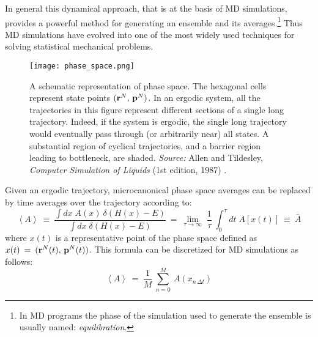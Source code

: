 In general this dynamical approach, that is at the basis of MD simulations, provides a powerful method for generating an ensemble and its averages.\footnote{In MD programs the phase of the simulation used to generate the ensemble is usually named: \textit{equilibration}.} Thus MD simulations have evolved into one of the most widely used techniques for solving statistical mechanical problems.

\begin{figure}[H]
\centering
\begin{minipage}[t]{0.8\textwidth}
	\centering
    \texttt{[image: phase\_space.png]}
    
    \footnotesize{\caption{A schematic representation of phase space. The hexagonal cells represent state points $( \bold{r}^N, \, \bold{p}^N )$. In an ergodic system, all the trajectories in this figure represent different sections of a single long trajectory. Indeed, if the system is ergodic, the single long trajectory would eventually pass through (or arbitrarily near) all states. A substantial region of cyclical trajectories, and a barrier region leading to bottleneck, are shaded. 
    \textit{Source:} Allen and Tildesley, \textit{Computer Simulation of Liquids} (1st edition, 1987) 
    \cite{ref:AllenTildesley_1ed}.}
    \label{fig:generation-of-microcan_state}
    }
\end{minipage} 
\end{figure}

Given an ergodic trajectory, microcanonical phase space averages can be replaced by time averages over the trajectory according to:
\begin{equation}\label{eq:stat_mean_val}
\left< A \right> \:\equiv\: 
\frac{\int dx \; A(x) \: \delta(H (x) - E)}{\int dx \; \delta(H (x) - E)} \:=\: 
\lim_{\tau \rightarrow \infty} \; \frac{1}{\tau} \: \int_0^\tau dt \; A[x(t)] \:\equiv\: \bar{A}
\end{equation}
where $x(t)$ is a representative point of the phase space defined as $x(t) \:=\: ( \bold{r}^N(t), \, \bold{p}^N(t) )$. 
This formula can be discretized for MD simulations as follows:
\begin{equation}\label{eq:stat_mean_val-discr}
\left< A \right> \:=\: \frac{1}{M} \: \sum_{n = 0}^M \: A(x_{n \, \Delta t})
\end{equation}


